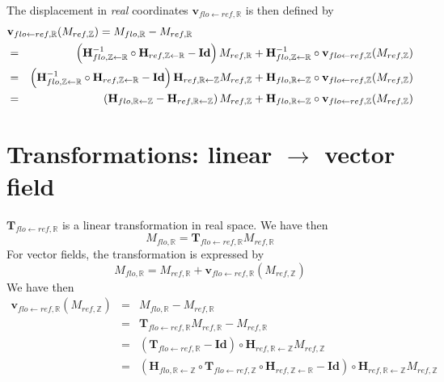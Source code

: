 The displacement in \textit{real} coordinates $\mathbf{v}_{flo \leftarrow ref,\mathbb{R}}$ is then defined by
\begin{eqnarray*}
\lefteqn{
\mathbf{v}_{flo \leftarrow ref,\mathbb{R}}( M_{ref,\mathbb{Z}} )
= M_{flo,\mathbb{R}} - M_{ref,\mathbb{R}}} \\
& = & 
\left(
\mathbf{H}^{-1}_{flo, \mathbb{Z} \leftarrow \mathbb{R}}
\circ 
\mathbf{H}_{ref, \mathbb{Z} \leftarrow \mathbb{R}}
- \mathbf{Id} \right) M_{ref,\mathbb{R}}
+ 
\mathbf{H}^{-1}_{flo, \mathbb{Z} \leftarrow \mathbb{R}}
\circ \mathbf{v}_{flo \leftarrow ref,\mathbb{Z}}( M_{ref,\mathbb{Z}} ) \\
& = & 
\left(
\mathbf{H}^{-1}_{flo, \mathbb{Z} \leftarrow \mathbb{R}}
\circ 
\mathbf{H}_{ref, \mathbb{Z} \leftarrow \mathbb{R}}
- \mathbf{Id} \right) 
\mathbf{H}_{ref, \mathbb{R} \leftarrow \mathbb{Z}}
M_{ref,\mathbb{Z}}
+ 
\mathbf{H}_{flo, \mathbb{R} \leftarrow \mathbb{Z}}
\circ \mathbf{v}_{flo \leftarrow ref,\mathbb{Z}}( M_{ref,\mathbb{Z}} ) \\
& = & 
\left(
\mathbf{H}_{flo, \mathbb{R} \leftarrow \mathbb{Z}}
-
\mathbf{H}_{ref, \mathbb{R} \leftarrow \mathbb{Z}}
\right)
M_{ref,\mathbb{Z}}
+ 
\mathbf{H}_{flo, \mathbb{R} \leftarrow \mathbb{Z}}
\circ \mathbf{v}_{flo \leftarrow ref,\mathbb{Z}}( M_{ref,\mathbb{Z}} ) \\
\end{eqnarray*}





\section{Transformations: linear $\rightarrow$ vector field}

$\mathbf{T}_{flo \leftarrow ref, \mathbb{R}}$ is a linear transformation in real space. We have then
\begin{displaymath}
M_{flo, \mathbb{R}} = 
\mathbf{T}_{flo \leftarrow ref, \mathbb{R}}
M_{ref, \mathbb{R}}
\end{displaymath}
For vector fields, the transformation is expressed by
\begin{displaymath}
M_{flo, \mathbb{R}} = 
M_{ref, \mathbb{R}} 
+ \mathbf{v}_{flo \leftarrow ref, \mathbb{R}}(M_{ref, \mathbb{Z}})
\end{displaymath}
We have then
\begin{eqnarray*}
\mathbf{v}_{flo \leftarrow ref, \mathbb{R}}(M_{ref, \mathbb{Z}}) & = & 
M_{flo, \mathbb{R}} - M_{ref, \mathbb{R}} \\
& = &
\mathbf{T}_{flo \leftarrow ref, \mathbb{R}}
M_{ref, \mathbb{R}} - M_{ref, \mathbb{R}} \\
& = &
\left( \mathbf{T}_{flo \leftarrow ref, \mathbb{R}} - \mathbf{Id} \right) \circ
\mathbf{H}_{ref, \mathbb{R} \leftarrow \mathbb{Z}} M_{ref, \mathbb{Z}} \\
& = &
\left( \mathbf{H}_{flo,\mathbb{R} \leftarrow \mathbb{Z}} \circ
\mathbf{T}_{flo \leftarrow ref, \mathbb{Z}} \circ
\mathbf{H}_{ref,\mathbb{Z} \leftarrow \mathbb{R}} - \mathbf{Id} \right) \circ
\mathbf{H}_{ref, \mathbb{R} \leftarrow \mathbb{Z}} M_{ref, \mathbb{Z}} \\
\end{eqnarray*}

